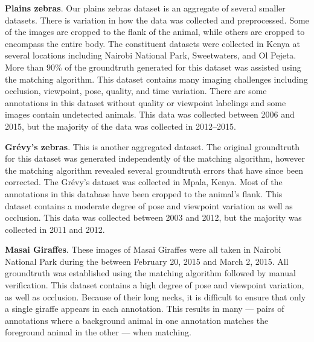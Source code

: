         \begin{itemln}
            \item \textbf{Plains zebras}.
            Our plains zebras dataset is an aggregate of several smaller datasets.
            There is variation in how the data was collected and preprocessed.
            Some of the images are cropped to the flank of the animal, while others are cropped to encompass the
              entire body.
            The constituent datasets were collected in Kenya at several locations including Nairobi National
              Park, Sweetwaters, and Ol Pejeta.
            More than $90\percent$ of the groundtruth generated for this dataset was assisted using the matching
              algorithm.
            This dataset contains many imaging challenges including occlusion, viewpoint, pose, quality, and time
              variation.
            There are some annotations in this dataset without quality or viewpoint labelings and some images
              contain undetected animals.
            This data was collected between 2006 and 2015, but the majority of the data was collected in
              2012--2015.

            \item \textbf{Grévy's zebras}.
            This is another aggregated dataset.
            The original groundtruth for this dataset was generated independently of the matching algorithm,
              however the matching algorithm revealed several groundtruth errors that have since been corrected.
            The Grévy's dataset was collected in Mpala, Kenya.
            Most of the annotations in this database have been cropped to the animal's flank.
            This dataset contains a moderate degree of pose and viewpoint variation as well as occlusion.
            This data was collected between 2003 and 2012, but the majority was collected in 2011 and 2012.

            \item \textbf{Masai Giraffes}.
            These images of Masai Giraffes were all taken in Nairobi National Park during the \GZC{} between
              February 20, 2015 and March 2, 2015.
            All groundtruth was established using the matching algorithm followed by manual verification.
            This dataset contains a high degree of pose and viewpoint variation, as well as occlusion.
            Because of their long necks, it is difficult to ensure that only a single giraffe appears in each
              annotation.
            This results in many  --- pairs of annotations where a background animal in one
              annotation matches the foreground animal in the other --- when matching.


\end{itemln}
